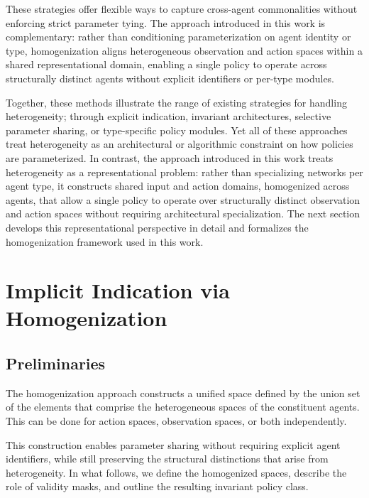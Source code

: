 These strategies offer flexible ways to capture cross-agent commonalities without 
enforcing strict parameter tying. The approach introduced in this work is complementary: 
rather than conditioning parameterization on agent identity or type, 
homogenization aligns heterogeneous observation and action spaces within a 
shared representational domain, enabling a single policy to operate across 
structurally distinct agents without explicit identifiers or per-type modules.

Together, these methods illustrate the range of existing strategies for 
handling heterogeneity; through explicit indication, invariant architectures, 
selective parameter sharing, or type-specific policy modules. 
Yet all of these approaches treat heterogeneity as an architectural or 
algorithmic constraint on how policies are parameterized. 
In contrast, the approach introduced in this work treats heterogeneity as a 
representational problem: rather than specializing networks per agent type, 
it constructs shared input and action domains, homogenized across agents,
that allow a single policy to operate over structurally distinct observation 
and action spaces without requiring architectural specialization.
The next section develops this representational perspective in detail and 
formalizes the homogenization framework used in this work.


\section{Implicit Indication via Homogenization}
\label{con2:sec:method_homogenization}

\subsection{Preliminaries}

The homogenization approach constructs a unified space defined by the union set 
of the elements that comprise the heterogeneous spaces of the constituent agents.
This can be done for action spaces, observation spaces, or both independently.

This construction enables parameter sharing without requiring explicit agent identifiers, 
while still preserving the structural distinctions that arise from heterogeneity. 
In what follows, we define the homogenized spaces, describe the role of validity masks, 
and outline the resulting invariant policy class.

